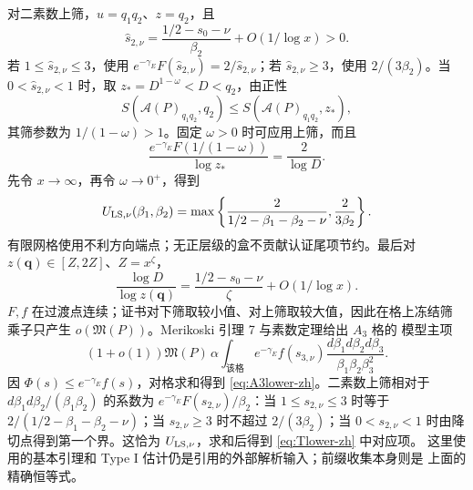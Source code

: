 \documentclass[UTF8,10pt,a4paper]{ctexart}
\newcommand{\Acal}{\mathcal{A}}
\newcommand{\1}{\mathbf{1}}
\theoremstyle{remark}
\begin{document}
对二素数上筛，$u=q_1q_2$、$z=q_2$，且
\[
 \widehat s_{2,\nu}
 =\frac{1/2-s_0-\nu}{\beta_2}+O(1/\log x)>0.
\]
若 $1\le\widehat s_{2,\nu}\le3$，使用
$e^{-\gamma_E}F(\widehat s_{2,\nu})=2/\widehat s_{2,\nu}$；若
$\widehat s_{2,\nu}\ge3$，使用 $2/(3\beta_2)$。当
$0<\widehat s_{2,\nu}<1$ 时，取
$z_*=D^{1-\omega}<D<q_2$，由正性
\[
 S(\Acal(P)_{q_1q_2},q_2)
 \le S(\Acal(P)_{q_1q_2},z_*),
\]
其筛参数为 $1/(1-\omega)>1$。固定 $\omega>0$ 时可应用上筛，而且
\[
 \frac{e^{-\gamma_E}F(1/(1-\omega))}{\log z_*}
 =\frac2{\log D}.
\]
先令 $x\to\infty$，再令 $\omega\to0^+$，得到
\[
 U_{{\rm LS},\nu}(\beta_1,\beta_2)
 =\max\left\{
 \frac2{1/2-\beta_1-\beta_2-\nu},
 \frac2{3\beta_2}\right\}.
\]
有限网格使用不利方向端点；无正层级的盒不贡献认证尾项节约。最后对
$z(\boldsymbol q)\in[Z,2Z]$、$Z=x^\zeta$，
\[
 \frac{\log D}{\log z(\boldsymbol q)}
 =\frac{1/2-s_0-\nu}{\zeta}+O(1/\log x).
\]
$F,f$ 在过渡点连续；证书对下筛取较小值、对上筛取较大值，因此在格上冻结筛
乘子只产生 $o(\mathfrak M(P))$。Merikoski 引理 7 与素数定理给出 $A_3$ 格的
模型主项
\[
 (1+o(1))\mathfrak M(P)\,\alpha
 \int_{\text{该格}}e^{-\gamma_E}f(s_{3,\nu})
 \frac{d\beta_1d\beta_2d\beta_3}
      {\beta_1\beta_2\beta_3^2}.
\]
因 $\Phi(s)\le e^{-\gamma_E}f(s)$，对格求和得到
\eqref{eq:A3lower-zh}。二素数上筛相对于
$d\beta_1d\beta_2/(\beta_1\beta_2)$ 的系数为
$e^{-\gamma_E}F(s_{2,\nu})/\beta_2$：当 $1\le s_{2,\nu}\le3$ 时等于
$2/(1/2-\beta_1-\beta_2-\nu)$；当 $s_{2,\nu}\ge3$ 时不超过
$2/(3\beta_2)$；当 $0<s_{2,\nu}<1$ 时由降切点得到第一个界。这恰为
$U_{{\rm LS},\nu}$，求和后得到 \eqref{eq:Tlower-zh} 中对应项。
这里使用的基本引理和 Type I 估计仍是引用的外部解析输入；前缀收集本身则是
上面的精确恒等式。
\end{document}
